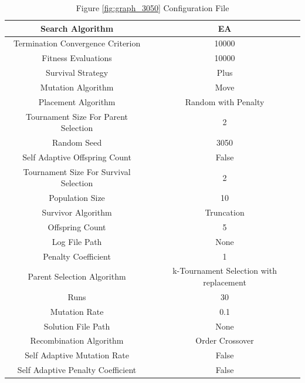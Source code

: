 \documentclass{standalone}
\begin{document}
\begin{table}[!htb]
	\centering
	\caption{Figure \ref{fig:graph_3050} Configuration File}
	\label{tab:graph_3050}
	\begin{tabular}{| c | c |}
		\hline
		Search Algorithm		& EA		 \\
		\hline
		Termination Convergence Criterion		& 10000		 \\
		\hline
		Fitness Evaluations		& 10000		 \\
		\hline
		Survival Strategy		& Plus		 \\
		\hline
		Mutation Algorithm		& Move		 \\
		\hline
		Placement Algorithm		& Random with Penalty		 \\
		\hline
		Tournament Size For Parent Selection		& 2		 \\
		\hline
		Random Seed		& 3050		 \\
		\hline
		Self Adaptive Offspring Count		& False		 \\
		\hline
		Tournament Size For Survival Selection		& 2		 \\
		\hline
		Population Size		& 10		 \\
		\hline
		Survivor Algorithm		& Truncation		 \\
		\hline
		Offspring Count		& 5		 \\
		\hline
		Log File Path		& None		 \\
		\hline
		Penalty Coefficient		& 1		 \\
		\hline
		Parent Selection Algorithm		& k-Tournament Selection with replacement		 \\
		\hline
		Runs		& 30		 \\
		\hline
		Mutation Rate		& 0.1		 \\
		\hline
		Solution File Path		& None		 \\
		\hline
		Recombination Algorithm		& Order Crossover		 \\
		\hline
		Self Adaptive Mutation Rate		& False		 \\
		\hline
		Self Adaptive Penalty Coefficient		& False		 \\
		\hline
	\end{tabular}
\end{table}
\end{document}
